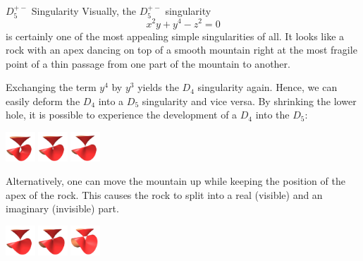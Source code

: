 \begin{surferPage}[D5+- Singularity]{$D_5^{+-}$ Singularity}
	Visually, the $D_5^{+-}$ singularity
	\[
		x^2y+y^4-z^2=0
	\]
	is certainly one of the most appealing simple singularities of all. It looks like a rock with an apex dancing on top of a smooth mountain right at the most fragile point of a thin passage from one part of the mountain to another.

	Exchanging the term $y^4$ by $y^3$ yields the $D_4$ singularity again. Hence, we can easily deform the $D_4$ into a $D_5$ singularity and vice versa. By shrinking the lower hole, it is possible to experience the development of a $D_4$ into the $D_5$:
	\begin{Centering*}%
		\includegraphics[width=1.1cm]{../../common/images/D5pm_03}\quad%
		\includegraphics[width=1.1cm]{../../common/images/D5pm_02}\quad%
		\includegraphics[width=1.1cm]{../../common/images/D5pm_01}%
	\end{Centering*}
	Alternatively, one can move the mountain up while keeping the position of the apex of the rock. This causes the rock to split into a real (visible) and an imaginary (invisible) part.
	\begin{Centering*}%
		\includegraphics[width=1.1cm]{../../common/images/D5pm_01}\quad%
		\includegraphics[width=1.1cm]{../../common/images/D5pm_04}\quad%
		\includegraphics[width=1.1cm]{../../common/images/D5pm_05}%
	\end{Centering*}
\end{surferPage}
